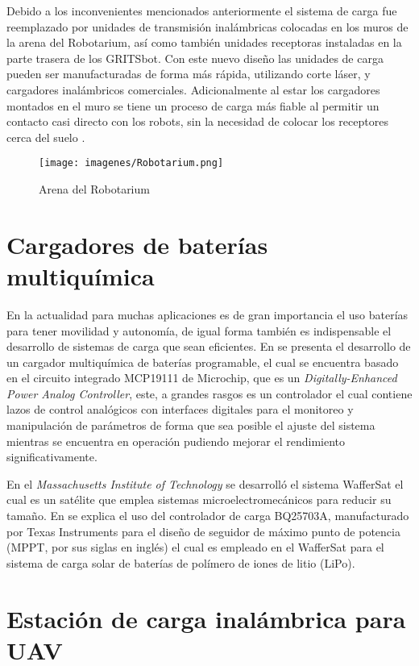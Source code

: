 Debido a los inconvenientes mencionados anteriormente el sistema de carga fue reemplazado por unidades de transmisión
inalámbricas colocadas en los muros de la arena del Robotarium, así como también unidades receptoras instaladas en la 
parte trasera de los GRITSbot. Con este nuevo diseño las unidades de carga pueden ser manufacturadas de forma
 más rápida, utilizando corte láser, y cargadores inalámbricos comerciales. Adicionalmente al estar los cargadores
 montados en el muro se tiene un proceso de carga más fiable al permitir un contacto casi directo con los robots,
 sin la necesidad de colocar los receptores cerca del suelo \cite{wilson_robotarium_2021}. 

 \begin{figure}[H]
    \centering
    \texttt{[image: imagenes/Robotarium.png]}
    \caption{Arena del  Robotarium  \cite{wilson_robotarium_2021}}
    \label{fig:robotarium}
\end{figure}

\section{Cargadores de baterías multiquímica}
En la actualidad para muchas aplicaciones es de gran importancia el uso
baterías para tener movilidad y autonomía, de igual forma también es indispensable
el desarrollo de sistemas de carga que sean eficientes. En \cite{cleveland_developing_2015}
se presenta el desarrollo de un cargador multiquímica de baterías programable, el cual se 
encuentra basado en el circuito integrado MCP19111 de Microchip, que es un
\textit{Digitally-Enhanced Power Analog Controller}, este, a grandes rasgos es un controlador el cual
contiene lazos de control analógicos con interfaces digitales para el monitoreo y manipulación de parámetros
de forma que sea posible el ajuste del sistema mientras se encuentra en operación pudiendo mejorar el rendimiento
significativamente.  

En el \textit{Massachusetts Institute of Technology} se desarrolló el sistema WafferSat el cual  es un satélite que emplea 
sistemas microelectromecánicos para reducir su tamaño. En \cite{zapien_electrical_2020} se explica el uso del controlador de 
carga BQ25703A, manufacturado por Texas Instruments para el diseño de seguidor de máximo punto de potencia (MPPT, por
sus siglas en inglés) el cual es empleado en el WafferSat para el sistema de carga solar de baterías de polímero
 de iones de litio (LiPo).

\section{Estación de carga inalámbrica para UAV}

